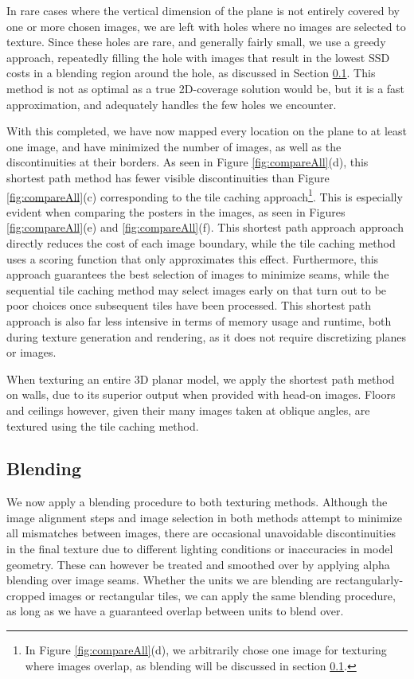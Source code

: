 \documentclass[]{spie}  %
\begin{document}
In rare cases where the vertical dimension of the plane is not
entirely covered by one or more chosen images, we are left with holes
where no images are selected to texture. Since these holes are rare,
and generally fairly small, we use a greedy approach, repeatedly
filling the hole with images that result in the lowest SSD costs in a
blending region around the hole, as discussed in Section
\ref{sec:blending}. This method is not as optimal as a true
2D-coverage solution would be, but it is a fast approximation, and
adequately handles the few holes we encounter.

With this completed, we have now mapped every location on the plane to
at least one image, and have minimized the number of images, as well
as the discontinuities at their borders. As seen in Figure
\ref{fig:compareAll}(d), this shortest path method has fewer visible
discontinuities than Figure \ref{fig:compareAll}(c) corresponding to
the tile caching approach\footnote{In Figure \ref{fig:compareAll}(d),
  we arbitrarily chose one image for texturing where images overlap,
  as blending will be discussed in section \ref{sec:blending}.}. This
is especially evident when comparing the posters in the images, as
seen in Figures \ref{fig:compareAll}(e) and
\ref{fig:compareAll}(f). This shortest path approach approach directly
reduces the cost of each image boundary, while the tile caching method
uses a scoring function that only approximates this
effect. Furthermore, this approach guarantees the best selection of
images to minimize seams, while the sequential tile caching method may
select images early on that turn out to be poor choices once
subsequent tiles have been processed. This shortest path approach is
also far less intensive in terms of memory usage and runtime, both
during texture generation and rendering, as it does not require
discretizing planes or images.

When texturing an entire 3D planar model, we apply the shortest path
method on walls, due to its superior output when provided with head-on
images. Floors and ceilings however, given their many images taken at
oblique angles, are textured using the tile caching method.


\subsection{Blending}
\label{sec:blending}
We now apply a blending procedure to both texturing methods. Although
the image alignment steps and image selection in both methods attempt
to minimize all mismatches between images, there are occasional
unavoidable discontinuities in the final texture due to different
lighting conditions or inaccuracies in model geometry. These can
however be treated and smoothed over by applying alpha blending over
image seams.  Whether the units we are blending are
rectangularly-cropped images or rectangular tiles, we can apply the
same blending procedure, as long as we have a guaranteed overlap
between units to blend over.
\end{document}
